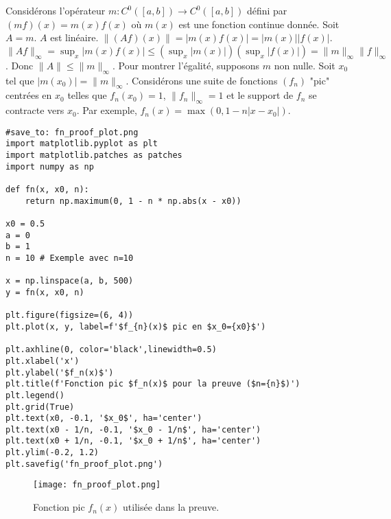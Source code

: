 \documentclass{article}
\theoremstyle{definition} %
\begin{document}
Considérons l'opérateur $m: C^0([a,b]) \to C^0([a,b])$ défini par $(m f)(x) = m(x) f(x)$ où $m(x)$ est une fonction continue donnée.
Soit $A = m$. $A$ est linéaire.
$\|(Af)(x)\| = |m(x) f(x)| = |m(x)| |f(x)|$.
$\|Af\|_\infty = \sup_x |m(x) f(x)| \le (\sup_x |m(x)|) (\sup_x |f(x)|) = \|m\|_\infty \|f\|_\infty$.
Donc $\|A\| \le \|m\|_\infty$.
Pour montrer l'égalité, supposons $m$ non nulle. Soit $x_0$ tel que $|m(x_0)| = \|m\|_\infty$.
Considérons une suite de fonctions $(f_n)$ "pic" centrées en $x_0$ telles que $f_n(x_0)=1$, $\|f_n\|_\infty=1$ et le support de $f_n$ se contracte vers $x_0$.
Par exemple, $f_n(x) = \max(0, 1 - n|x-x_0|)$.
\begin{verbatim}
#save_to: fn_proof_plot.png
import matplotlib.pyplot as plt
import matplotlib.patches as patches
import numpy as np

def fn(x, x0, n):
    return np.maximum(0, 1 - n * np.abs(x - x0))

x0 = 0.5
a = 0
b = 1
n = 10 # Exemple avec n=10

x = np.linspace(a, b, 500)
y = fn(x, x0, n)

plt.figure(figsize=(6, 4))
plt.plot(x, y, label=f'$f_{n}(x)$ pic en $x_0={x0}$')

plt.axhline(0, color='black',linewidth=0.5)
plt.xlabel('x')
plt.ylabel('$f_n(x)$')
plt.title(f'Fonction pic $f_n(x)$ pour la preuve ($n={n}$)')
plt.legend()
plt.grid(True)
plt.text(x0, -0.1, '$x_0$', ha='center')
plt.text(x0 - 1/n, -0.1, '$x_0 - 1/n$', ha='center')
plt.text(x0 + 1/n, -0.1, '$x_0 + 1/n$', ha='center')
plt.ylim(-0.2, 1.2)
plt.savefig('fn_proof_plot.png')
\end{verbatim}

\begin{figure}[H]
\centering
\texttt{[image: fn\_proof\_plot.png]}
\caption{Fonction pic $f_n(x)$ utilisée dans la preuve.}
\label{fig:fn_proof_plot}
\end{figure}
\end{document}
